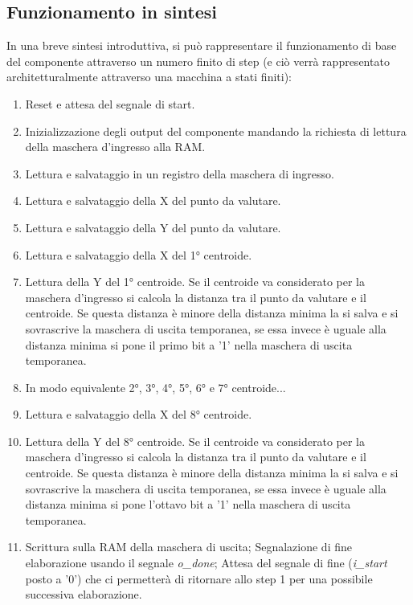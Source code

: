 \documentclass{article}
\begin{document}
\subsection{Funzionamento in sintesi}
In una breve sintesi introduttiva, si può rappresentare il funzionamento di base del componente attraverso un numero finito di step (e ciò verrà rappresentato architetturalmente attraverso una macchina a stati finiti):
\begin{enumerate}
    \item Reset e attesa del segnale di start.
    \item Inizializzazione degli output del componente mandando la richiesta di lettura della maschera d'ingresso alla RAM.
    \item Lettura e salvataggio in un registro della maschera di ingresso.
    \item Lettura e salvataggio della X del punto da valutare.
    \item Lettura e salvataggio della Y del punto da valutare.
    \item Lettura e salvataggio della X del 1° centroide.
    \item Lettura della Y del 1° centroide. Se il centroide va considerato per la maschera d'ingresso si calcola la distanza tra il punto da valutare e il centroide. Se questa distanza è minore della distanza minima la si salva e si sovrascrive la maschera di uscita temporanea, se essa invece è uguale alla distanza minima si pone il primo bit a '1' nella maschera di uscita temporanea.
    \item In modo equivalente 2°, 3°, 4°, 5°, 6° e 7° centroide... \addtocounter{enumi}{11}
    \item Lettura e salvataggio della X del 8° centroide.
    \item Lettura della Y del 8° centroide. Se il centroide va considerato per la maschera d'ingresso si calcola la distanza tra il punto da valutare e il centroide. Se questa distanza è minore della distanza minima la si salva e si sovrascrive la maschera di uscita temporanea, se essa invece è uguale alla distanza minima si pone l'ottavo bit a '1' nella maschera di uscita temporanea.
    \item Scrittura sulla RAM della maschera di uscita; Segnalazione di fine elaborazione usando il segnale \textit{o\_done}; Attesa del segnale di fine (\textit{i\_start} posto a '0') che ci permetterà di ritornare allo step 1 per una possibile successiva elaborazione.
\end{enumerate}
\end{document}
